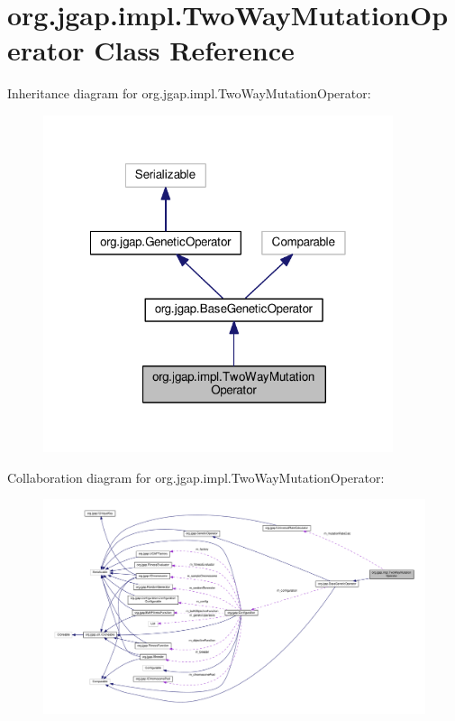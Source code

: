 \hypertarget{classorg_1_1jgap_1_1impl_1_1_two_way_mutation_operator}{\section{org.\-jgap.\-impl.\-Two\-Way\-Mutation\-Operator Class Reference}
\label{classorg_1_1jgap_1_1impl_1_1_two_way_mutation_operator}
}


Inheritance diagram for org.\-jgap.\-impl.\-Two\-Way\-Mutation\-Operator\-:
\nopagebreak
\begin{figure}[H]
\begin{center}
\leavevmode
\includegraphics[width=291pt]{classorg_1_1jgap_1_1impl_1_1_two_way_mutation_operator__inherit__graph}
\end{center}
\end{figure}


Collaboration diagram for org.\-jgap.\-impl.\-Two\-Way\-Mutation\-Operator\-:
\nopagebreak
\begin{figure}[H]
\begin{center}
\leavevmode
\includegraphics[width=350pt]{classorg_1_1jgap_1_1impl_1_1_two_way_mutation_operator__coll__graph}
\end{center}
\end{figure}
